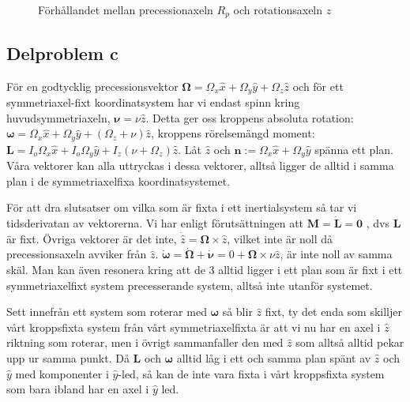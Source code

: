 \documentclass[12pt,a4paper]{article}
\begin{document}
	\begin{figure}
		\begin{center}
			
			\caption{Förhållandet mellan precessionaxeln $R_p$ och rotationsaxeln $z$}
                        \label{jorden}
		\end{center}
	\end{figure}

	\subsection{Delproblem c}
		För en godtycklig precessionsvektor $\boldsymbol{\Omega}= \Omega_x \hat{x} + \Omega_y \hat{y} + \Omega_z \hat{z}$
		och för ett symmetriaxel-fixt 
		koordinatsystem har vi endast spinn kring huvudsymmetriaxeln, $\boldsymbol{\nu}=\nu \hat{z}$.
		Detta ger oss kroppens absoluta rotation: 
		$\boldsymbol{\omega}=\Omega_x \hat{x} + \Omega_y \hat{y} + (\Omega_z + \nu )\hat{z}$, kroppens rörelsemängd moment: 
		$\mathbf{L}=I_o \Omega_x \hat{x} + I_o \Omega_y \hat{y} + I_z (\nu + \Omega_z) \hat{z}$.
		Låt $\hat{z}$ och $\mathbf{n} := \Omega_x \hat{x} + \Omega_y \hat{y}$ 
		spänna ett plan. Våra vektorer kan alla uttryckas i dessa vektorer, alltså ligger de alltid i samma plan i de symmetriaxelfixa koordinatsystemet. 
		
		
		För att dra slutsatser om vilka som är fixta i ett inertialsystem så tar vi tidsderivatan av
		vektorerna. Vi har enligt förutsättningen att $\mathbf{M} = \dot{\mathbf{L}} = \mathbf{0}$ ,
		dvs $\mathbf{L}$ är fixt. Övriga vektorer är det inte, $\dot{\hat{z}}=\boldsymbol{\Omega} \times \hat{z}$,
		vilket inte är noll då precessionsaxeln avviker från $\hat{z}$. $\dot{\boldsymbol{\omega}} = \dot{\boldsymbol{\Omega}}+\dot{\boldsymbol{\nu}} =
		0 + \boldsymbol{\Omega} \times \nu \hat{z}$, är inte noll av samma skäl.
		Man kan även resonera kring att de 3 alltid ligger i ett plan som är fixt i 
		ett symmetriaxelfixt system precesserande system, alltså inte utanför systemet.
		
		Sett innefrån ett system som roterar med $\boldsymbol{\omega}$ så blir $\hat{z}$ fixt, ty det enda som skilljer vårt kroppsfixta system från 
		vårt symmetriaxelfixta är att vi nu har en axel i $\hat{z}$ riktning som roterar, men i övrigt sammanfaller den med $\hat{z}$ som alltså alltid pekar upp ur samma punkt.
		Då $\mathbf{L}$ och $\boldsymbol{\omega}$ alltid låg i ett och samma plan spänt av $\hat{z}$ och $\hat{y}$ med komponenter i $\hat{y}$-led, så kan de inte vara fixta i vårt kroppsfixta system som bara ibland har en axel i $\hat{y}$ led.
		
\end{document}
